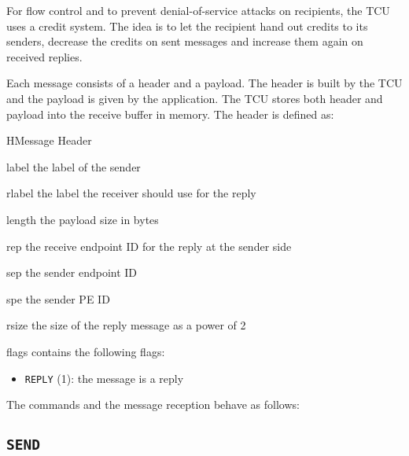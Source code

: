 For flow control and to prevent denial-of-service attacks on recipients, the TCU uses a credit
system. The idea is to let the recipient hand out credits to its senders, decrease the credits on
sent messages and increase them again on received replies.

Each message consists of a header and a payload. The header is built by the TCU and the payload is
given by the application. The TCU stores both header and payload into the receive buffer in memory.
The header is defined as:

\begin{register}{H}{Message Header}{}
  \regnewline%
  \regnewline%
  \begin{regdesc}\begin{reglist}
    \item[label] the label of the sender
    \item[rlabel] the label the receiver should use for the reply
    \item[length] the payload size in bytes
    \item[rep] the receive endpoint ID for the reply at the sender side
    \item[sep] the sender endpoint ID
    \item[spe] the sender PE ID
    \item[rsize] the size of the reply message as a power of 2
    \item[flags] contains the following flags:
    \begin{itemize}
      \item \texttt{REPLY} (1): the message is a reply
    \end{itemize}
  \end{reglist}\end{regdesc}
\end{register}

\noindent The commands and the message reception behave as follows:

\subsection{\texttt{SEND}}

